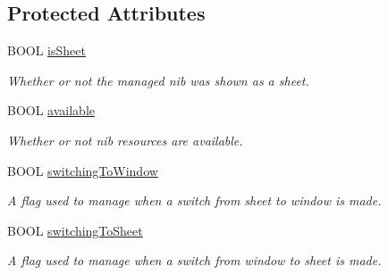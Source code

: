 \subsection*{Protected Attributes}
\begin{DoxyCompactItemize}
\item 
\hypertarget{interface_g_d_external_nib_controller_a18cc1869bd259980388c1874e73a9427}{
BOOL \hyperlink{interface_g_d_external_nib_controller_a18cc1869bd259980388c1874e73a9427}{isSheet}}
\label{interface_g_d_external_nib_controller_a18cc1869bd259980388c1874e73a9427}

\begin{DoxyCompactList}\small\item\em Whether or not the managed nib was shown as a sheet. \item\end{DoxyCompactList}\item 
\hypertarget{interface_g_d_external_nib_controller_a2f228beb6ac6e742cd9130493da38838}{
BOOL \hyperlink{interface_g_d_external_nib_controller_a2f228beb6ac6e742cd9130493da38838}{available}}
\label{interface_g_d_external_nib_controller_a2f228beb6ac6e742cd9130493da38838}

\begin{DoxyCompactList}\small\item\em Whether or not nib resources are available. \item\end{DoxyCompactList}\item 
\hypertarget{interface_g_d_external_nib_controller_a2e535a2768d394211c1e27705b3b251f}{
BOOL \hyperlink{interface_g_d_external_nib_controller_a2e535a2768d394211c1e27705b3b251f}{switchingToWindow}}
\label{interface_g_d_external_nib_controller_a2e535a2768d394211c1e27705b3b251f}

\begin{DoxyCompactList}\small\item\em A flag used to manage when a switch from sheet to window is made. \item\end{DoxyCompactList}\item 
\hypertarget{interface_g_d_external_nib_controller_afb68255184b36a7c0d5d7e85217e5963}{
BOOL \hyperlink{interface_g_d_external_nib_controller_afb68255184b36a7c0d5d7e85217e5963}{switchingToSheet}}
\label{interface_g_d_external_nib_controller_afb68255184b36a7c0d5d7e85217e5963}

\begin{DoxyCompactList}\small\item\em A flag used to manage when a switch from window to sheet is made. \item\end{DoxyCompactList}\end{DoxyCompactItemize}

